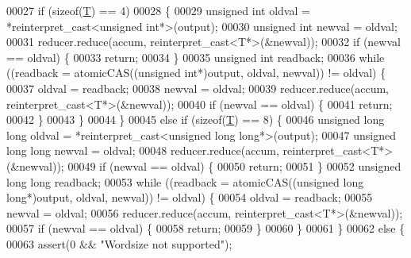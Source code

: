 \begin{DoxyCode}
00027   \textcolor{keywordflow}{if} (\textcolor{keyword}{sizeof}(\hyperlink{group___sparse_core___module_class_eigen_1_1_triplet}{T}) == 4)
00028   \{
00029     \textcolor{keywordtype}{unsigned} \textcolor{keywordtype}{int} oldval = *\textcolor{keyword}{reinterpret\_cast<}\textcolor{keywordtype}{unsigned} \textcolor{keywordtype}{int}*\textcolor{keyword}{>}(output);
00030     \textcolor{keywordtype}{unsigned} \textcolor{keywordtype}{int} newval = oldval;
00031     reducer.reduce(accum, reinterpret\_cast<T*>(&newval));
00032     \textcolor{keywordflow}{if} (newval == oldval) \{
00033       \textcolor{keywordflow}{return};
00034     \}
00035     \textcolor{keywordtype}{unsigned} \textcolor{keywordtype}{int} readback;
00036     \textcolor{keywordflow}{while} ((readback = atomicCAS((\textcolor{keywordtype}{unsigned} \textcolor{keywordtype}{int}*)output, oldval, newval)) != oldval) \{
00037       oldval = readback;
00038       newval = oldval;
00039       reducer.reduce(accum, reinterpret\_cast<T*>(&newval));
00040       \textcolor{keywordflow}{if} (newval == oldval) \{
00041         \textcolor{keywordflow}{return};
00042       \}
00043     \}
00044   \}
00045   \textcolor{keywordflow}{else} \textcolor{keywordflow}{if} (\textcolor{keyword}{sizeof}(\hyperlink{group___sparse_core___module_class_eigen_1_1_triplet}{T}) == 8) \{
00046     \textcolor{keywordtype}{unsigned} \textcolor{keywordtype}{long} \textcolor{keywordtype}{long} oldval = *\textcolor{keyword}{reinterpret\_cast<}\textcolor{keywordtype}{unsigned} \textcolor{keywordtype}{long} \textcolor{keywordtype}{long}*\textcolor{keyword}{>}(output);
00047     \textcolor{keywordtype}{unsigned} \textcolor{keywordtype}{long} \textcolor{keywordtype}{long} newval = oldval;
00048     reducer.reduce(accum, reinterpret\_cast<T*>(&newval));
00049     \textcolor{keywordflow}{if} (newval == oldval) \{
00050       \textcolor{keywordflow}{return};
00051     \}
00052     \textcolor{keywordtype}{unsigned} \textcolor{keywordtype}{long} \textcolor{keywordtype}{long} readback;
00053     \textcolor{keywordflow}{while} ((readback = atomicCAS((\textcolor{keywordtype}{unsigned} \textcolor{keywordtype}{long} \textcolor{keywordtype}{long}*)output, oldval, newval)) != oldval) \{
00054       oldval = readback;
00055       newval = oldval;
00056       reducer.reduce(accum, reinterpret\_cast<T*>(&newval));
00057       \textcolor{keywordflow}{if} (newval == oldval) \{
00058         \textcolor{keywordflow}{return};
00059       \}
00060     \}
00061   \}
00062   \textcolor{keywordflow}{else} \{
00063     assert(0 && \textcolor{stringliteral}{"Wordsize not supported"});

\end{DoxyCode}
